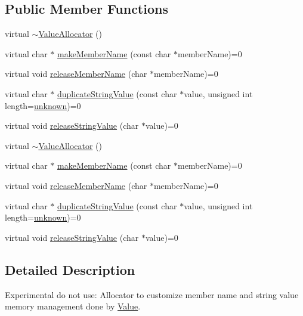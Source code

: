 \subsection*{Public Member Functions}
\begin{DoxyCompactItemize}
\item 
virtual \hyperlink{classJson_1_1ValueAllocator_a3c931f5b641a77f5b18a62e54cbb244d}{$\sim$\-Value\-Allocator} ()
\item 
virtual char $\ast$ \hyperlink{classJson_1_1ValueAllocator_af2370043912c62bb2f3d3277b2c0a125}{make\-Member\-Name} (const char $\ast$member\-Name)=0
\item 
virtual void \hyperlink{classJson_1_1ValueAllocator_ae8206cbaf1004994696a1ffec0d7e29a}{release\-Member\-Name} (char $\ast$member\-Name)=0
\item 
virtual char $\ast$ \hyperlink{classJson_1_1ValueAllocator_aaa63197291f55d060541a01fcf5a5dfc}{duplicate\-String\-Value} (const char $\ast$value, unsigned int length=\hyperlink{classJson_1_1ValueAllocator_a4ad5932b165e5b11e1a6227f503e38a6a38d36853ecb0922efe7ac03c10d5cf75}{unknown})=0
\item 
virtual void \hyperlink{classJson_1_1ValueAllocator_aa75c50f08bab7db386673ab355668c99}{release\-String\-Value} (char $\ast$value)=0
\item 
virtual \hyperlink{classJson_1_1ValueAllocator_a3c931f5b641a77f5b18a62e54cbb244d}{$\sim$\-Value\-Allocator} ()
\item 
virtual char $\ast$ \hyperlink{classJson_1_1ValueAllocator_af2370043912c62bb2f3d3277b2c0a125}{make\-Member\-Name} (const char $\ast$member\-Name)=0
\item 
virtual void \hyperlink{classJson_1_1ValueAllocator_ae8206cbaf1004994696a1ffec0d7e29a}{release\-Member\-Name} (char $\ast$member\-Name)=0
\item 
virtual char $\ast$ \hyperlink{classJson_1_1ValueAllocator_aaa63197291f55d060541a01fcf5a5dfc}{duplicate\-String\-Value} (const char $\ast$value, unsigned int length=\hyperlink{classJson_1_1ValueAllocator_a4ad5932b165e5b11e1a6227f503e38a6a38d36853ecb0922efe7ac03c10d5cf75}{unknown})=0
\item 
virtual void \hyperlink{classJson_1_1ValueAllocator_aa75c50f08bab7db386673ab355668c99}{release\-String\-Value} (char $\ast$value)=0
\end{DoxyCompactItemize}


\subsection{Detailed Description}
Experimental do not use\-: Allocator to customize member name and string value memory management done by \hyperlink{classJson_1_1Value}{Value}. 



